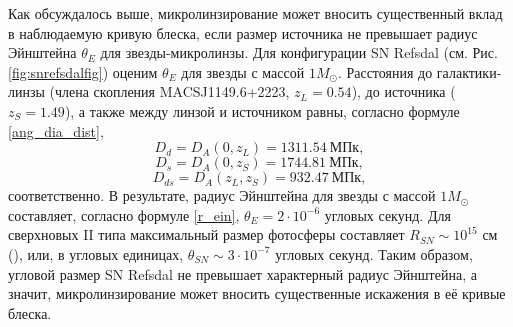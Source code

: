 Как обсуждалось выше, микролинзирование может вносить существенный вклад в наблюдаемую кривую блеска, если размер источника не превышает радиус Эйнштейна $\theta_E$ для звезды-микролинзы. Для конфигурации SN Refsdal (см. Рис. \ref{fig:snrefsdalfig}) оценим $\theta_E$ для звезды с массой $1 M_{\odot}$. Расстояния до галактики-линзы (члена скопления MACSJ1149.6+2223, $z_L=0.54$), до источника ($z_S=1.49$), а также между линзой и источником равны, согласно формуле \eqref{ang_dia_dist}, 
$$ D_d=D_A(0,z_L)=1311.54 \ \textrm{МПк}, $$
$$ D_s=D_A(0,z_S)=1744.81 \ \textrm{МПк}, $$
$$ D_{ds}=D_A(z_L,z_S)=932.47 \ \textrm{МПк}, $$
соответственно. В результате, радиус Эйнштейна для звезды с массой $1 M_{\odot}$ составляет, согласно формуле \eqref{r_ein}, $\theta_E = 2 \cdot 10^{-6}$ угловых секунд. Для сверхновых II типа максимальный размер фотосферы составляет $R_{SN} \sim 10^{15}$ см (\cite{razmer}), или, в угловых единицах, $\theta_{SN} \sim 3 \cdot 10^{-7}$ угловых секунд. Таким образом, угловой размер SN Refsdal не превышает характерный радиус Эйнштейна, а значит, микролинзирование может вносить существенные искажения в её кривые блеска.